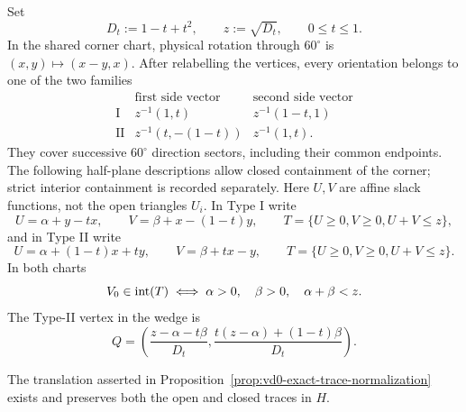 Set
\[
 D_t:=1-t+t^2,\qquad z:=\sqrt{D_t},\qquad0\le t\le1.
\]
In the shared corner chart, physical rotation through $60^\circ$ is
$(x,y)\mapsto(x-y,x)$. After relabelling the vertices, every orientation
belongs to one of the two families
\[
\begin{array}{c|cc}
 &\text{first side vector}&\text{second side vector}\\ \hline
\mathrm I&z^{-1}(1,t)&z^{-1}(1-t,1)\\
\mathrm {II}&z^{-1}(t,-(1-t))&z^{-1}(1,t).
\end{array}
\]
They cover successive $60^\circ$ direction sectors, including their
common endpoints. The following half-plane descriptions allow closed
containment of the corner; strict interior containment is recorded separately.
Here $U,V$ are affine slack functions, not the open triangles $U_i$.
In Type I write
\begin{equation}
 U=\alpha+y-tx,\qquad V=\beta+x-(1-t)y,\qquad
 T=\{U\ge0,V\ge0,U+V\le z\},
 \label{eq:orientation-type-I}
\end{equation}
and in Type II write
\begin{equation}
 U=\alpha+(1-t)x+ty,\qquad V=\beta+tx-y,\qquad
 T=\{U\ge0,V\ge0,U+V\le z\}.
 \label{eq:orientation-type-II}
\end{equation}
In both charts
\begin{equation}
 V_0\in\mathrm{int}(T)\iff
 \alpha>0,\quad\beta>0,\quad\alpha+\beta<z.
 \label{eq:orientation-interior}
\end{equation}
The Type-II vertex in the wedge is
\begin{equation}
 Q=\left(
 \frac{z-\alpha-t\beta}{D_t},
 \frac{t(z-\alpha)+(1-t)\beta}{D_t}
 \right).
 \label{eq:orientation-type-II-Q}
\end{equation}

\begin{lemma}
\label{lem:app-vd0-trace-normalization-calculation}
The translation asserted in
Proposition~\ref{prop:vd0-exact-trace-normalization} exists and preserves both
the open and closed traces in $H$.
\end{lemma}

